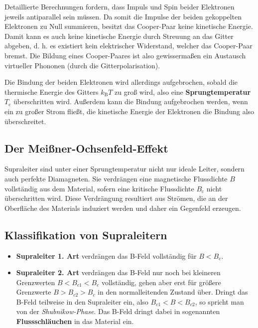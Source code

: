 Detaillierte Berechnungen fordern, dass Impuls und Spin beider Elektronen jeweils antiparallel sein müssen.
Da somit die Impulse der beiden gekoppelten Elektronen zu Null summieren, besitzt das Cooper-Paar keine kinetische Energie.
Damit kann es auch keine kinetische Energie durch Streuung an das Gitter abgeben, d. h. es existiert kein elektrischer Widerstand, welcher das Cooper-Paar bremst.
Die Bildung eines Cooper-Paares ist also gewissermaßen ein Austausch virtueller Phononen (durch die Gitterpolarisation).

Die Bindung der beiden Elektronen wird allerdings aufgebrochen, sobald die thermische Energie des Gitters $k_\text{B}T$ zu groß wird, also eine \textbf{Sprungtemperatur} $T_\text{c}$ überschritten wird.
Außerdem kann die Bindung aufgebrochen werden, wenn ein zu großer Strom fließt, die kinetische Energie der Elektronen die Bindung also überschreitet.

\subsection{Der Meißner-Ochsenfeld-Effekt}
Supraleiter sind unter einer Sprungtemperatur nicht nur ideale Leiter, sondern auch perfekte Diamagneten.
Sie verdrängen eine magnetische Flussdichte $B$ vollständig aus dem Material, sofern eine kritische Flussdichte $B_\text{c}$ nicht überschritten wird.
Diese Verdrängung resultiert aus Strömen, die an der Oberfläche des Materials induziert werden und daher ein Gegenfeld erzeugen.

\subsection{Klassifikation von Supraleitern}
\begin{itemize}
	\item \textbf{Supraleiter 1. Art} verdrängen das B-Feld vollständig für $B<B_\text{c}$.
	\item \textbf{Supraleiter 2. Art} verdrängen das B-Feld nur noch bei kleineren Grenzwerten $B<B_{c1}<B_c$ vollständig, gehen aber erst für größere Grenzwerte $B>B_{c2}>B_c$ in den normalleitenden Zustand über.
	Dringt das B-Feld teilweise in den Supraleiter ein, also $B_{c1}<B<B_{c2}$, so spricht man von der \textit{Shubnikow-Phase}.
	Das B-Feld dringt dabei in sogenannten \textbf{Flussschläuchen} in das Material ein.
\end{itemize}
